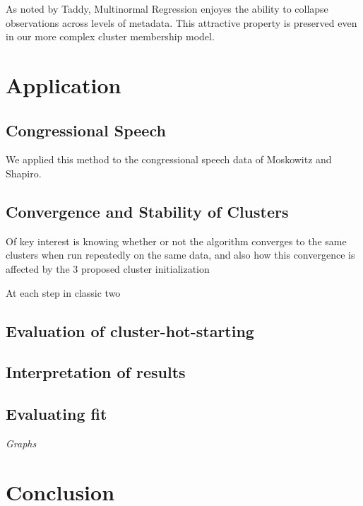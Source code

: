 \documentclass[12pt]{article}
\begin{document}
As noted by Taddy, Multinormal Regression enjoyes the ability to
collapse observations across levels of metadata. This attractive
property is preserved even in our more complex cluster membership model.

\section{Application}\label{application}

\subsection{Congressional Speech} 

We applied this method to the congressional speech data of Moskowitz and Shapiro. 

\subsection{Convergence and Stability of Clusters}

Of key interest is knowing whether or not the algorithm converges to the same clusters when run repeatedly on the same data, and also how this convergence is affected by the 3 proposed cluster initialization 

At each step in classic two 

\subsection{Evaluation of cluster-hot-starting} 
\subsection{Interpretation of results}
\subsection{Evaluating fit}



\emph{Graphs}

\section{Conclusion}\label{conclusion}







\newpage
\end{document}

